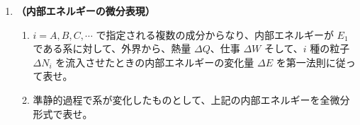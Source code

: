 \documentclass[uplatex,dvipdfmx,a4paper,11pt]{jsarticle}
\newcommand{\diff}{\mathrm d}
\begin{document}
\begin{enumerate}
\item
{\bf （内部エネルギーの微分表現）}

\begin{enumerate}
\item
$i = A, B, C, \cdots$ で指定される複数の成分からなり、内部エネルギーが $E_1$ である系に対して、外界から、熱量 $\Delta Q$、仕事 $\Delta W$ そして、$i$ 種の粒子 $\Delta N_i$ を流入させたときの内部エネルギーの変化量 $\Delta E$ を第一法則に従って表せ。

%
%

\item
準静的過程で系が変化したものとして、上記の内部エネルギーを全微分形式で表せ。

%
%
%
%
%


\end{enumerate}
\end{enumerate}
\end{document}
